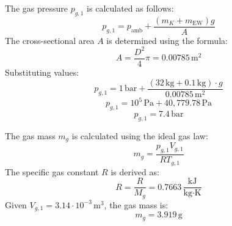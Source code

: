 The gas pressure \( p_{g,1} \) is calculated as follows:  
\[
p_{g,1} = p_{\text{amb}} + \frac{(m_K + m_{\text{EW}}) g}{A}
\]  
The cross-sectional area \( A \) is determined using the formula:  
\[
A = \frac{D^2}{4} \pi = 0.00785 \, \text{m}^2
\]  
Substituting values:  
\[
p_{g,1} = 1 \, \text{bar} + \frac{(32 \, \text{kg} + 0.1 \, \text{kg}) \cdot g}{0.00785 \, \text{m}^2}
\]  
\[
p_{g,1} = 10^5 \, \text{Pa} + 40,779.78 \, \text{Pa}
\]  
\[
p_{g,1} = 7.4 \, \text{bar}
\]  

The gas mass \( m_g \) is calculated using the ideal gas law:  
\[
m_g = \frac{p_{g,1} V_{g,1}}{R T_{g,1}}
\]  
The specific gas constant \( R \) is derived as:  
\[
R = \frac{R}{M_g} = 0.7663 \, \frac{\text{kJ}}{\text{kg·K}}
\]  
Given \( V_{g,1} = 3.14 \cdot 10^{-3} \, \text{m}^3 \), the gas mass is:  
\[
m_g = 3.919 \, \text{g}
\]